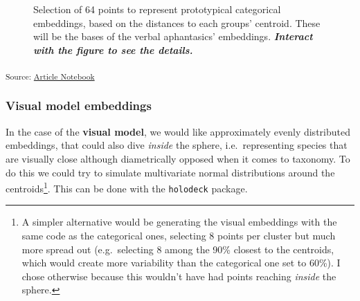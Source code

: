 \documentclass[
  authoryear]{elsarticle}
\begin{document}
\label{cell-fig-categorical-embeddings}
\begin{figure}[H]


\caption{\label{fig-categorical-embeddings}Selection of 64 points to
represent prototypical categorical embeddings, based on the distances to
each groups' centroid. These will be the bases of the verbal
aphantasics' embeddings. \textbf{\emph{Interact with the figure to see
the details.}}}

\end{figure}%

\textsubscript{Source:
\href{https://m-delem.github.io/2499-similarity-manuscript/index.qmd.html}{Article
Notebook}}

\subsubsection{Visual model embeddings}\label{visual-model-embeddings}

In the case of the \textbf{visual model}, we would like approximately
evenly distributed embeddings, that could also dive \emph{inside} the
sphere, i.e.~representing species that are visually close although
diametrically opposed when it comes to taxonomy. To do this we could try
to simulate multivariate normal distributions around the
centroids\footnote{A simpler alternative would be generating the visual
  embeddings with the same code as the categorical ones, selecting 8
  points per cluster but much more spread out (e.g.~selecting 8 among
  the 90\% closest to the centroids, which would create more variability
  than the categorical one set to 60\%). I chose otherwise because this
  wouldn't have had points reaching \emph{inside} the sphere.}. This can
be done with the \texttt{holodeck} package.
\end{document}
